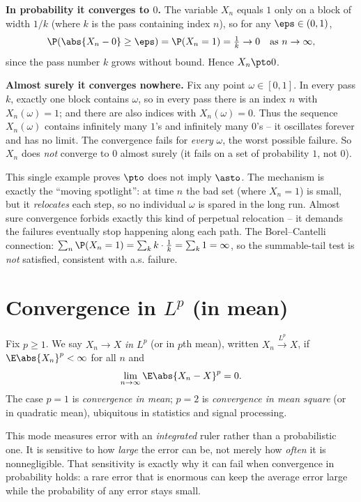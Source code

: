 \textbf{In probability it converges to $0$.} The variable $X_n$ equals $1$ only on a
block of width $1/k$ (where $k$ is the pass containing index $n$), so for any
$\eps\in(0,1)$,
\[
  \P(\abs{X_n - 0}\ge\eps) = \P(X_n = 1) = \tfrac{1}{k} \to 0
  \quad\text{as } n\to\infty,
\]
since the pass number $k$ grows without bound. Hence $X_n \pto 0$.

\textbf{Almost surely it converges nowhere.} Fix any point $\omega\in[0,1]$. In every
pass $k$, exactly one block contains $\omega$, so in every pass there is an index $n$
with $X_n(\omega) = 1$; and there are also indices with $X_n(\omega) = 0$. Thus the
sequence $X_n(\omega)$ contains infinitely many $1$'s and infinitely many $0$'s -- it
oscillates forever and has no limit. The convergence fails for \emph{every}
$\omega$, the worst possible failure. So $X_n$ does \emph{not} converge to $0$ almost
surely (it fails on a set of probability $1$, not $0$).

\begin{happeningbox}
This single example proves $\pto$ does not imply $\asto$. The mechanism is exactly the
``moving spotlight'': at time $n$ the bad set (where $X_n=1$) is small, but it
\emph{relocates} each step, so no individual $\omega$ is spared in the long run. Almost
sure convergence forbids exactly this kind of perpetual relocation -- it demands the
failures eventually stop happening along each path. The Borel--Cantelli connection:
$\sum_n \P(X_n=1) = \sum_k k\cdot\frac1k = \sum_k 1 = \infty$, so the summable-tail
test is \emph{not} satisfied, consistent with a.s. failure.
\end{happeningbox}

\section{Convergence in \texorpdfstring{$L^p$}{Lp} (in mean)}
\label{ch22:lp}

\begin{definition}[Convergence in $L^p$]
\label{ch22:def-lp}
Fix $p\ge1$. We say $X_n \to X$ \emph{in $L^p$} (or in $p$th mean), written
$X_n \xrightarrow{L^p} X$, if $\E\abs{X_n}^p<\infty$ for all $n$ and
\[
  \lim_{n\to\infty}\E\abs{X_n - X}^p = 0.
\]
The case $p=1$ is \emph{convergence in mean}; $p=2$ is \emph{convergence in mean
square} (or in quadratic mean), ubiquitous in statistics and signal processing.
\end{definition}

This mode measures error with an \emph{integrated} ruler rather than a probabilistic
one. It is sensitive to how \emph{large} the error can be, not merely how \emph{often}
it is nonnegligible. That sensitivity is exactly why it can fail when convergence in
probability holds: a rare error that is enormous can keep the average error large while
the probability of any error stays small.

